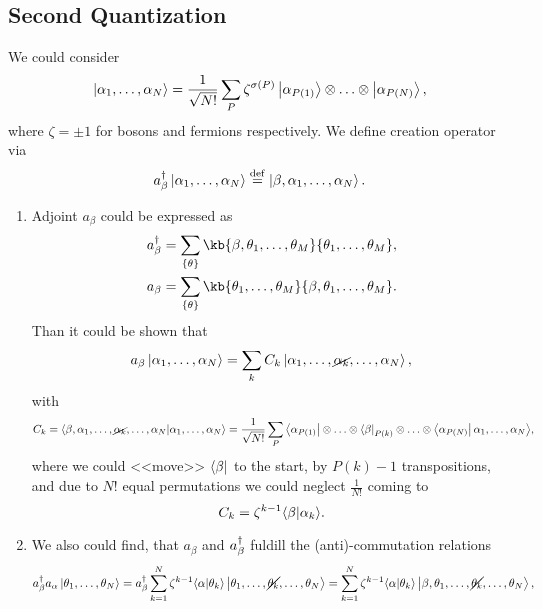 \subsection{Second Quantization}

We could consider
\begin{equation*}
	\left| \alpha_1,\ldots,\alpha_N \right\rangle = \frac{1}{\sqrt{N!}} \sum_{P} \zeta^{\sigma(P)} 
	\left| \alpha_{P(1)} \right\rangle \otimes \ldots \otimes \left| \alpha_{P(N)} \right\rangle,
\end{equation*}
where $\zeta= \pm 1$ for bosons and fermions respectively. We define creation operator via
\begin{equation*}
	a_{\beta}^{\dag} \left| \alpha_1,\ldots,\alpha_N \right\rangle \overset{\mathrm{def}}{=} \left| \beta,\alpha_1,\ldots,\alpha_N \right\rangle.
\end{equation*}
\begin{enumerate}
	\item Adjoint $a_\beta$ could be expressed as
	\begin{align*}
		a_\beta\D &= \sum_{\{\theta\}} \kb{\beta, \theta_1, \ldots, \theta_M}{\theta_1, \ldots, \theta_{M}}, \\
		a_\beta &= \sum_{\{\theta\}} \kb{\theta_1, \ldots, \theta_M}{\beta, \theta_1, \ldots, \theta_{M}}.
	\end{align*}
	Than it could be shown that
	\begin{equation*}
		a_\beta \left| \alpha_1,\ldots,\alpha_N \right\rangle = \sum_k C_k \left| \alpha_1,\ldots,\cancel{\alpha_k},\ldots,\alpha_N \right\rangle,
	\end{equation*}
	with 
	\begin{align*}
		C_k = \bk{\beta,\alpha_1,\ldots,\cancel{\alpha_k},\ldots,\alpha_N}{\alpha_1,\ldots,\alpha_N} 
		= \frac{1}{\sqrt{N!}}\sum_{P} \bra{\alpha_{P(1)}} \otimes \ldots \otimes \bra{\beta}_{P(k)} \otimes \ldots \otimes \bra{\alpha_{P(N)}} \alpha_1,\ldots,\alpha_N \big\rangle,
	\end{align*}
	where we could <<move>> $\left\langle \beta \right|$  to the start, by $P(k)-1$ transpositions, and due to $N!$ equal permutations we could neglect $\frac{1}{N!}$  coming to
	\begin{equation*}
		C_k = \zeta^{k-1} \bk{\beta}{\alpha_k}.
	\end{equation*}
	\item We also could find, that $a_\beta$ and $a_\beta^{\dag}$ fuldill the (anti)-commutation relations 
	\begin{align*}
		a_\beta\D a_\alpha \ket{\theta_1,\ldots,\theta_N} &= a_\beta\D \sum_{k=1}^{N} \zeta^{k-1} \bk{\alpha}{\theta_k} \ket{\theta_1,\ldots,\cancel{\theta_k},\ldots,\theta_N} = \sum_{k=1}^{N} \zeta^{k-1} \bk{\alpha}{\theta_k} \ket{\beta,\theta_1,\ldots,\cancel{\theta_k},\ldots,\theta_N}, \\

\end{align*}
\end{enumerate}
